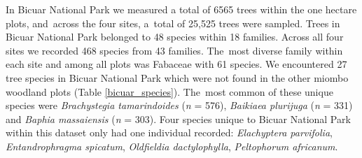 \documentclass[diversity,article,accept,moreauthors,pdftex]{Definitions/mdpi}
\newcommand{\nbicuartrees}{6565}
\newcommand{\nspecies}{468}
\newcommand{\nfamilies}{43}
\newcommand{\nfabaceaespecies}{61}
\newcommand{\nbicuaruniquespecies}{27}
\newcommand{\nbicuarspecies}{48}
\newcommand{\nbicuarfamilies}{18}
\newcommand{\nbg}{576}
\newcommand{\nbp}{331}
\newcommand{\nbm}{303}
\begin{document}
In Bicuar National Park we measured a total of \nbicuartrees{} trees within the one hectare plots, and~across the four sites,  a~total of 25,525 trees were sampled. Trees in Bicuar National Park belonged to \nbicuarspecies{} species within \nbicuarfamilies{} families. Across all four sites we recorded \nspecies{} species from \nfamilies{} families. The~most diverse family within each site and among all plots was Fabaceae with \nfabaceaespecies{} species. We encountered \nbicuaruniquespecies{} tree species in Bicuar National Park which were not found in the other miombo woodland plots (Table \ref{bicuar_species}). The~most common of these unique species were \textit{Brachystegia tamarindoides} (\emph{n} = \nbg{}), \textit{Baikiaea plurijuga} (\emph{n} = \nbp{}) and \textit{Baphia massaiensis} (\emph{n} = \nbm{}). Four species unique to Bicuar National Park within this dataset only had one individual recorded: \textit{Elachyptera parvifolia}, \textit{Entandrophragma spicatum}, \textit{Oldfieldia dactylophylla}, \textit{Peltophorum africanum}.
\end{document}
